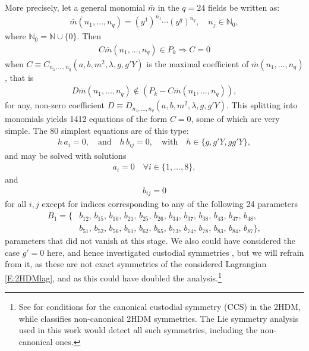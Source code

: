 \documentclass[a4paper,hidelinks, 12pt]{article}
\numberwithin{equation}{section}
\theoremstyle{plain}
\newcommand{\N}[1]{\mathbb{#1}}
\newcommand{\nn}{\nonumber}
\begin{document}
	More precisely, let a general monomial $\bar{m}$ in the $q=24$ fields  be written as:
	\begin{align}
		\bar{m}(n_1,\ldots,n_q)=(y^1)^{n_1}\cdots (y^{q})^{n_{q}},\quad n_j \in \N{N}_0,
	\end{align}
	where $\N{N}_0=\N{N}\cup\{0\}$.
	Then
	\begin{align}\label{E:coeffMonom=0}
		C \bar{m}(n_1,\ldots,n_q)\in P_k \Rightarrow C=0
		\end{align}
		when $C\equiv C_{n_1,\ldots,n_q}(a,b,m^2,\lambda,g,g'Y)$ is the maximal coefficient of $\bar{m}(n_1,\ldots,n_q)$, that is  
\begin{align}
	D \bar{m}(n_1,\ldots,n_q)\notin (P_k-C \bar{m}(n_1,\ldots,n_q)),
\end{align}
	for any, non-zero coefficient $D\equiv D_{n_1,\ldots,n_q}(a,b,m^2,\lambda,g,g'Y)$.	
This splitting into monomials yields 1412 equations of the form $C=0$, some of which are very simple.
	The 80 simplest equations are of this type: 
	\begin{align}\label{E:80simp2HDM}
		h\, a_i=0,\quad\text{and}\quad h\, b_{ij}=0, \quad \text{with}\quad h\in \{g,g'Y,g g'Y\},
	\end{align}
	 and may be solved with solutions 
	\begin{align}\label{E:a_i02HDM}
	a_i=0 	\quad \forall i \in \{1,\ldots, 8\},
	\end{align}
	and 
	\begin{align}\label{E:bijsubst12HDM}
	b_{ij}=0
	\end{align}
	for all $i,j$ except for indices corresponding to any of the following 24 parameters
	\begin{align}\label{E:B1_nozerobs2HDM}
	B_1=	\{&b_{1 2},\, b_{1 5},\, b_{1 6},\, b_{2 1},\, b_{2 5},\, b_{2 6},\, b_{3 4},\, 
 b_{3 7},\, b_{3 8},\, b_{4 3},\, b_{4 7},\, b_{4 8},\nn \\
&b_{5 1},\, b_{5 2},\, 
 b_{5 6},\, b_{6 1},\, b_{6 2},\, b_{6 5},\, b_{7 3},\, b_{7 4},\, b_{7 8},\, 
 b_{8 3},\, b_{8 4},\, b_{8 7}\},
	\end{align}
	parameters that did not vanish at this stage.
	We also could have considered the case $g'=0$ here, and hence investigated custodial symmetries \cite{Sikivie:1980hm}, but we will refrain
	from it, as these are not exact symmetries of the considered Lagrangian \eqref{E:2HDMlag}, and as this could have doubled the analysis.\footnote{See \cite{Grzadkowski:2010dj} for conditions for the canonical
custodial symmetry (CCS) in the 2HDM, while \cite{Pilaftsis:2011ed}
classifies non-canonical 2HDM symmetries. The Lie symmetry analysis used in
this work would detect all such symmetries, including the non-canonical
ones.}
\end{document}
